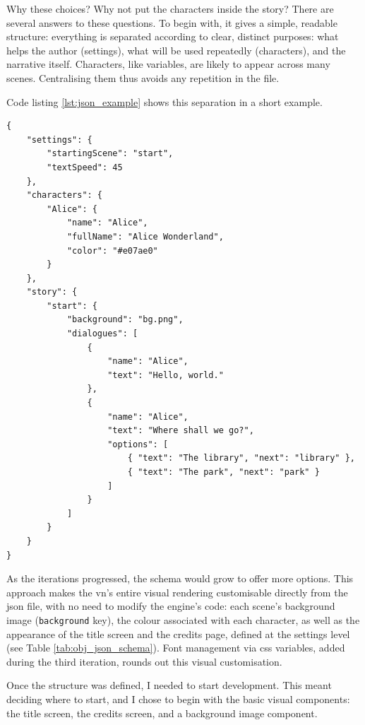 Why these choices? Why not put the characters inside the story? There are several answers to these questions. To begin with, it gives a simple, readable structure: everything is separated according to clear, distinct purposes: what helps the author (settings), what will be used repeatedly (characters), and the narrative itself. Characters, like variables, are likely to appear across many scenes. Centralising them thus avoids any repetition in the file.

\clearpage

Code listing \ref{lst:json_example} shows this separation in a short example.

\begin{listing}[H]
\begin{verbatim}
{
    "settings": {
        "startingScene": "start",
        "textSpeed": 45
    },
    "characters": {
        "Alice": {
            "name": "Alice",
            "fullName": "Alice Wonderland",
            "color": "#e07ae0"
        }
    },
    "story": {
        "start": {
            "background": "bg.png",
            "dialogues": [
                {
                    "name": "Alice",
                    "text": "Hello, world."
                },
                {
                    "name": "Alice",
                    "text": "Where shall we go?",
                    "options": [
                        { "text": "The library", "next": "library" },
                        { "text": "The park", "next": "park" }
                    ]
                }
            ]
        }
    }
}
\end{verbatim}
\caption{Example JSON file structure (Author 2026)}
\label{lst:json_example}
\end{listing}

\clearpage

As the iterations progressed, the \gls{schema} would grow to offer more options. This approach makes the \gls{vn}'s entire visual rendering customisable directly from the \gls{json} file, with no need to modify the engine's code: each scene's background image (\texttt{background} key), the colour associated with each character, as well as the appearance of the title screen and the credits page, defined at the settings level (see Table \ref{tab:obj_json_schema}). Font management via \acrshort{css} variables, added during the third iteration, rounds out this visual customisation.

Once the structure was defined, I needed to start development. This meant deciding where to start, and I chose to begin with the basic visual components: the title screen, the credits screen, and a background image component.

